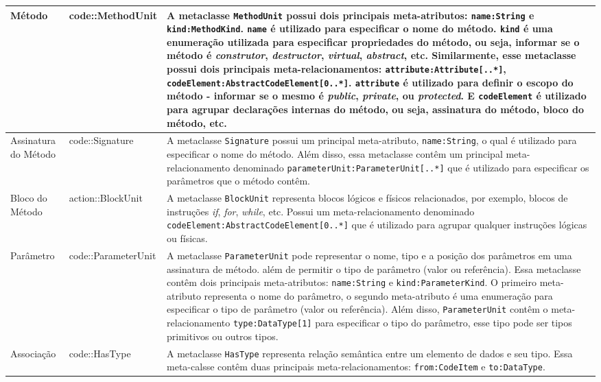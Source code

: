 \begin{longtable}[c]{| m{1.9cm} | m{3.57cm}| m{9.3cm} |}
Método & code::MethodUnit & A metaclasse \texttt{MethodUnit} possui dois principais meta-atributos: \texttt{name:String} e \texttt{kind:MethodKind}. \texttt{name} é utilizado para especificar o nome do método. \texttt{kind} é uma enumeração utilizada para especificar propriedades do método, ou seja, informar se o método é \textit{construtor}, \textit{destructor}, \textit{virtual}, \textit{abstract}, etc. Similarmente, esse metaclasse possui dois principais meta-relacionamentos: \texttt{attribute:Attribute[..*]}, \texttt{codeElement:AbstractCodeElement[0..*]}. \texttt{attribute} é utilizado para definir o escopo do método - informar se o mesmo é \textit{public}, \textit{private}, ou \textit{protected}. E \texttt{codeElement} é utilizado para agrupar declarações internas do método, ou seja, assinatura do método, bloco do método, etc.\\ 
\hline
Assinatura do Método & code::Signature & A metaclasse \texttt{Signature} possui um principal meta-atributo, \texttt{name:String}, o qual é utilizado para especificar o nome do método. Além disso, essa metaclasse contêm um principal meta-relacionamento denominado \texttt{parameterUnit:ParameterUnit[..*]} que é utilizado para especificar os parâmetros que o método contêm.\\ 
\hline
Bloco do Método & action::BlockUnit & A metaclasse \texttt{BlockUnit} representa blocos lógicos e físicos relacionados, por exemplo, blocos de instruções \textit{if}, \textit{for}, \textit{while}, etc. Possui um meta-relacionamento denominado \texttt{codeElement:AbstractCodeElement[0..*]} que é utilizado para agrupar qualquer instruções lógicas ou físicas.\\ 
\hline
Parâmetro & code::ParameterUnit & A metaclasse \texttt{ParameterUnit} pode representar o nome, tipo e a posição dos parâmetros em uma assinatura de método. além de permitir o tipo de parâmetro (valor ou referência). Essa metaclasse contêm dois principais meta-atributos: \texttt{name:String} e \texttt{kind:ParameterKind}. O primeiro meta-atributo representa o nome do parâmetro, o segundo meta-atributo é uma enumeração para especificar o tipo de parâmetro (valor ou referência). Além disso, \texttt{ParameterUnit} contêm o meta-relacionamento \texttt{type:DataType[1]} para especificar o tipo do parâmetro, esse tipo pode ser tipos primitivos ou outros tipos.\\ 
\hline
Associação & code::HasType & A metaclasse \texttt{HasType} representa relação semântica entre um elemento de dados e seu tipo. Essa meta-calsse contêm duas principais meta-relacionamentos: \texttt{from:CodeItem} e \texttt{to:DataType}.\\ 

\end{longtable}
